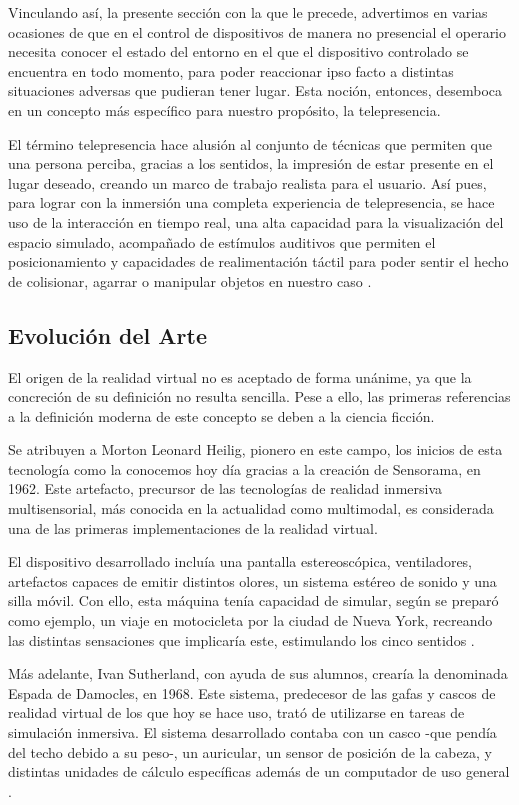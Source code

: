 Vinculando así, la presente sección con la que le precede, advertimos en varias ocasiones de que en el control de dispositivos de manera no presencial el operario necesita conocer el estado del entorno en el que el dispositivo controlado se encuentra en todo momento, para poder reaccionar ipso facto a distintas situaciones adversas que pudieran tener lugar. Esta noción, entonces, desemboca en un concepto más específico para nuestro propósito, la telepresencia.

El término telepresencia hace alusión al conjunto de técnicas que permiten que una persona perciba, gracias a los sentidos, la impresión de estar presente en el lugar deseado, creando un marco de trabajo realista para el usuario. Así pues, para lograr con la inmersión una completa experiencia de telepresencia, se hace uso de la interacción en tiempo real, una alta capacidad para la visualización del espacio simulado, acompañado de estímulos auditivos que permiten el posicionamiento y capacidades de realimentación táctil para poder sentir el hecho de colisionar, agarrar o manipular objetos en nuestro caso \cite{19}.

\subsection{Evolución del Arte}

El origen de la realidad virtual no es aceptado de forma unánime, ya que la concreción de su definición no resulta sencilla. Pese a ello, las primeras referencias a la definición moderna de este concepto se deben a la ciencia ficción.
 
Se atribuyen a Morton Leonard Heilig, pionero en este campo, los inicios de esta tecnología como la conocemos hoy día gracias a la creación de Sensorama, en 1962. Este artefacto, precursor de las tecnologías de realidad inmersiva multisensorial, más conocida en la actualidad como multimodal, es considerada una de las primeras implementaciones de la realidad virtual.

El dispositivo desarrollado incluía una pantalla estereoscópica, ventiladores, artefactos capaces de emitir distintos olores, un sistema estéreo de sonido y una silla móvil. Con ello, esta máquina tenía capacidad de simular, según se preparó como ejemplo, un viaje en motocicleta por la ciudad de Nueva York, recreando las distintas sensaciones que implicaría este, estimulando los cinco sentidos \cite{20}.

Más adelante, Ivan Sutherland, con ayuda de sus alumnos, crearía la denominada Espada de Damocles, en 1968. Este sistema, predecesor de las gafas y cascos de realidad virtual de los que hoy se hace uso, trató de utilizarse  en tareas de simulación inmersiva. El sistema desarrollado contaba con un casco -que pendía del techo debido a su peso-, un auricular, un sensor de posición de la cabeza, y distintas unidades de cálculo específicas además de un computador de uso general \cite{21}. 


